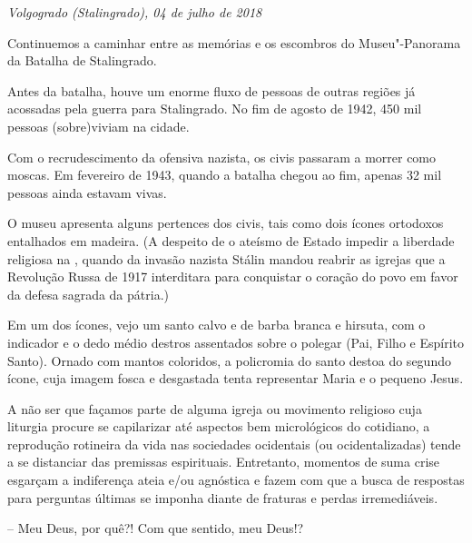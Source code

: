 \begin{flushright}
\emph{Volgogrado (Stalingrado), 04 de julho de 2018}
\end{flushright}

Continuemos a caminhar entre as memórias e os escombros do
Museu"-Panorama da Batalha de Stalingrado.

Antes da batalha, houve um enorme fluxo de pessoas de outras regiões já
acossadas pela guerra para Stalingrado. No fim de agosto de 1942, 450
mil pessoas (sobre)viviam na cidade.

Com o recrudescimento da ofensiva nazista, os civis passaram a morrer
como moscas. Em fevereiro de 1943, quando a batalha chegou ao fim,
apenas 32 mil pessoas ainda estavam vivas.

O museu apresenta alguns pertences dos civis, tais como dois ícones
ortodoxos entalhados em madeira. (A despeito de o ateísmo de Estado
impedir a liberdade religiosa na , quando da invasão nazista Stálin
mandou reabrir as igrejas que a Revolução Russa de 1917 interditara para
conquistar o coração do povo em favor da defesa sagrada da pátria.)

Em um dos ícones, vejo um santo calvo e de barba branca e hirsuta, com o
indicador e o dedo médio destros assentados sobre o polegar (Pai, Filho
e Espírito Santo). Ornado com mantos coloridos, a policromia do santo
destoa do segundo ícone, cuja imagem fosca e desgastada tenta
representar Maria e o pequeno Jesus.

A não ser que façamos parte de alguma igreja ou movimento religioso cuja
liturgia procure se capilarizar até aspectos bem micrológicos do
cotidiano, a reprodução rotineira da vida nas sociedades ocidentais (ou
ocidentalizadas) tende a se distanciar das premissas espirituais.
Entretanto, momentos de suma crise esgarçam a indiferença ateia e/ou
agnóstica e fazem com que a busca de respostas para perguntas últimas se
imponha diante de fraturas e perdas irremediáveis.

-- Meu Deus, por quê?! Com que sentido, meu Deus!?

